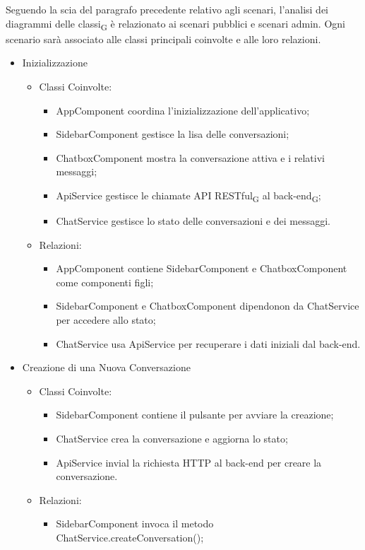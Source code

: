 Seguendo la scia del paragrafo precedente relativo agli scenari, l'analisi dei diagrammi delle classi\textsubscript{G} è relazionato ai scenari pubblici e scenari admin. Ogni scenario sarà associato alle classi principali coinvolte e alle loro relazioni.
\begin{itemize}
    \item Inizializzazione
    \begin{itemize}
        \item Classi Coinvolte:
        \begin{itemize}
            \item AppComponent coordina l'inizializzazione dell'applicativo;
            \item SidebarComponent gestisce la lisa delle conversazioni;
            \item ChatboxComponent mostra la conversazione attiva e i relativi messaggi;
            \item ApiService gestisce le chiamate API RESTful\textsubscript{G} al back-end\textsubscript{G};
            \item ChatService gestisce lo stato delle conversazioni e dei messaggi.
        \end{itemize}
        \item Relazioni:
        \begin{itemize}
            \item AppComponent contiene SidebarComponent e ChatboxComponent come componenti figli;
            \item SidebarComponent e ChatboxComponent dipendonon da ChatService per accedere allo stato;
            \item ChatService usa ApiService per recuperare i dati iniziali dal back-end.
        \end{itemize}
    \end{itemize}
    \item Creazione di una Nuova Conversazione
    \begin{itemize}
        \item Classi Coinvolte:
        \begin{itemize}
            \item SidebarComponent contiene il pulsante per avviare la creazione;
            \item ChatService crea la conversazione e aggiorna lo stato;
            \item ApiService invial la richiesta HTTP al back-end per creare la conversazione.
        \end{itemize}
        \item Relazioni:
        \begin{itemize}
            \item SidebarComponent invoca il metodo ChatService.createConversation();
        \end{itemize}
    \end{itemize}
\end{itemize}
